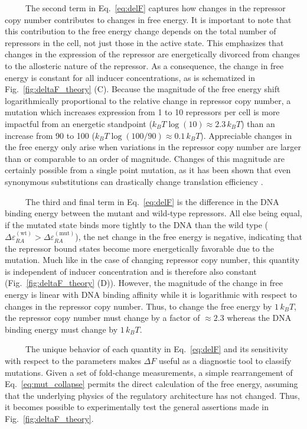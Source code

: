 \documentclass[12pt]{caltech_thesis}
\begin{document}
~~~~~The second term in Eq.~\ref{eq:delF} captures how changes in the
repressor copy number contributes to changes in free energy. It is
important to note that this contribution to the free energy change
depends on the total number of repressors in the cell, not just those in
the active state. This emphasizes that changes in the expression of the
repressor are energetically divorced from changes to the allosteric
nature of the repressor. As a consequence, the change in free energy is
constant for all inducer concentrations, as is schematized in
Fig.~\ref{fig:deltaF_theory} (C). Because the magnitude of the free
energy shift logarithmically proportional to the relative change in
repressor copy number, a mutation which increases expression from 1 to
10 repressors per cell is more impactful from an energetic standpoint
(\(k_BT \log(10) \approx 2.3\, k_BT\)) than an increase from 90 to 100
(\(k_BT \log(100/90) \approx 0.1\, k_BT\)). Appreciable changes in the
free energy only arise when variations in the repressor copy number are
larger than or comparable to an order of magnitude. Changes of this
magnitude are certainly possible from a single point mutation, as it has
been shown that even synonymous substitutions can drastically change
translation efficiency \autocite{frumkin2018}.

~~~~~The third and final term in Eq.~\ref{eq:delF} is the difference in
the DNA binding energy between the mutant and wild-type repressors. All
else being equal, if the mutated state binds more tightly to the DNA
than the wild type
(\(\Delta\varepsilon_{RA}^\mathrm{(wt)}> \Delta\varepsilon_{RA}^\mathrm{(mut)}\)),
the net change in the free energy is negative, indicating that the
repressor bound states become more energetically favorable due to the
mutation. Much like in the case of changing repressor copy number, this
quantity is independent of inducer concentration and is therefore also
constant (Fig.~\ref{fig:deltaF_theory} (D)). However, the magnitude of
the change in free energy is linear with DNA binding affinity while it
is logarithmic with respect to changes in the repressor copy number.
Thus, to change the free energy by \(1\, k_BT\), the repressor copy
number must change by a factor of \(\approx 2.3\) whereas the DNA
binding energy must change by \(1\, k_BT\).

~~~~~The unique behavior of each quantity in Eq.~\ref{eq:delF} and its
sensitivity with respect to the parameters makes \(\Delta F\) useful as
a diagnostic tool to classify mutations. Given a set of fold-change
measurements, a simple rearrangement of Eq.~\ref{eq:mut_collapse}
permits the direct calculation of the free energy, assuming that the
underlying physics of the regulatory architecture has not changed. Thus,
it becomes possible to experimentally test the general assertions made
in Fig.~\ref{fig:deltaF_theory}.
\end{document}
